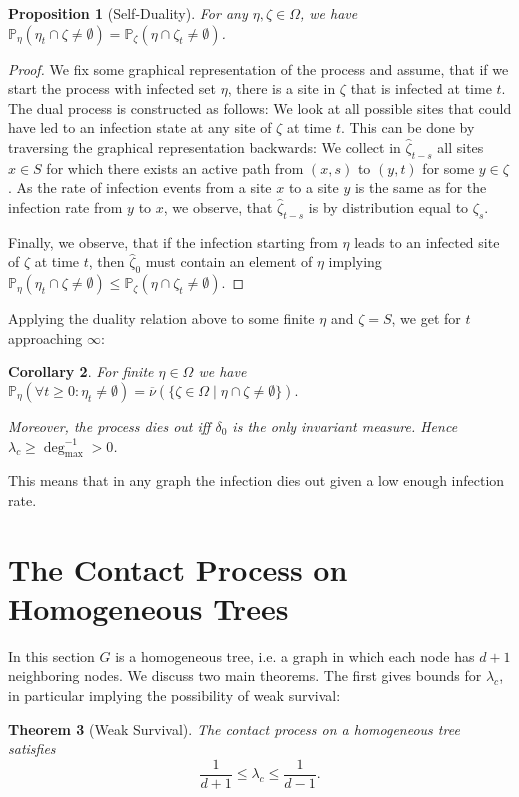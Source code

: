 \documentclass[a4paper,11pt]{amsart}
\theoremstyle{theorem}
\newtheorem{theorem}{Theorem}[section]
\newtheorem{proposition}[theorem]{Proposition}
\newtheorem{corollary}[theorem]{Corollary}
\theoremstyle{definition}
\renewcommand{\P}{\mathbb{P}}
\begin{document}
\begin{proposition}[Self-Duality]
	For any $\eta, \zeta\in \Omega$, we have $\P_\eta(\eta_t \cap \zeta \neq \emptyset) = \P_\zeta(\eta \cap \zeta_t \neq \emptyset)$.
\end{proposition}
\begin{proof}
	We fix some graphical representation of the process and assume, that if we start the process with infected set $\eta$, there is a site in $\zeta$ that is infected at time $t$.
	The dual process is constructed as follows:
	We look at all possible sites that could have led to an infection state at any site of $\zeta$ at time $t$.
	This can be done by traversing the graphical representation backwards:
	We collect in $\hat{\zeta}_{t-s}$ all sites $x\in S$ for which there exists an active path from $(x,s)$ to $(y,t)$ for some $y\in \zeta$.
	As the rate of infection events from a site $x$ to a site $y$ is the same as for the infection rate from $y$ to $x$, we observe, that $\hat{\zeta}_{t-s}$ is by distribution equal to $\zeta_s$.
	
	Finally, we observe, that if the infection starting from $\eta$ leads to an infected site of $\zeta$ at time $t$, then $\hat{\zeta}_0$ must contain an element of $\eta$ implying $\P_\eta(\eta_t \cap \zeta \neq \emptyset) \leq \P_\zeta(\eta \cap \zeta_t \neq \emptyset)$.
\end{proof}
Applying the duality relation above to some finite $\eta$ and $\zeta=S$, we get for $t$ approaching $\infty$:
\begin{corollary}\label{cor:weak-survival}
For finite $\eta\in\Omega$ we have $\P_\eta(\forall t\geq0: \eta_t\neq\emptyset) = \overline{\nu}(\{ \zeta\in\Omega \mid \eta\cap\zeta\neq\emptyset \}).$

Moreover, the process dies out iff $\delta_0$ is the only invariant measure.
Hence $\lambda_c \geq \deg_{\max}^{-1} > 0$.
\end{corollary}

This means that in any graph the infection dies out given a low enough infection rate.

\section{The Contact Process on Homogeneous Trees}
In this section $G$ is a homogeneous tree, i.e. a graph in which each node has $d+1$ neighboring nodes.
We discuss two main theorems.
The first gives bounds for $\lambda_c$, in particular implying the possibility of weak survival:
\begin{theorem}[Weak Survival]\label{thm:weak-survival}
	The contact process on a homogeneous tree satisfies
	$$\frac{1}{d+1} \leq \lambda_c \leq \frac{1}{d-1}.$$
\end{theorem}
\end{document}
